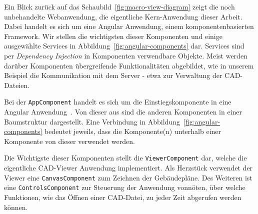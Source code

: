 Ein Blick zurück auf das Schaubild~\ref{fig:macro-view-diagram} zeigt die noch unbehandelte Webanwendung, die eigentliche Kern-Anwendung dieser Arbeit.
Dabei handelt es sich um eine Angular Anwendung, einem komponentenbasierten Framework.
Wir stellen die wichtigsten dieser Komponenten und einige ausgewählte Services in Abbildung~\ref{fig:angular-components} dar.
Services sind per \textit{Dependency Injection} in Komponenten verwendbare Objekte.
Meist werden darüber Komponenten übergreifende Funktionalitäten abgebildet, wie in unserem Beispiel die Kommunikation mit dem Server - etwa zur Verwaltung der CAD-Dateien.

Bei der \texttt{AppComponent} handelt es sich um die Einstiegskomponente in eine Angular Anwendung~\cite{AngularEntryComponent}.
Von dieser aus sind die anderen Komponenten in einer Baumstruktur dargestellt.
Eine Verbindung in Abbildung~\ref{fig:angular-components} bedeutet jeweils, dass die Komponente(n) unterhalb einer Komponente von dieser verwendet werden.

Die Wichtigste dieser Komponenten stellt die \texttt{ViewerComponent} dar, welche die eigentliche CAD-Viewer Anwendung implementiert.
Als Herzstück verwendet der Viewer eine \texttt{CanvasComponent} zum Zeichnen der Gebäudepläne.
Des Weiteren ist eine \texttt{ControlsComponent} zur Steuerung der Anwendung vonnöten, über welche Funktionen, wie das Öffnen einer CAD-Datei, zu jeder Zeit abgerufen werden können.

